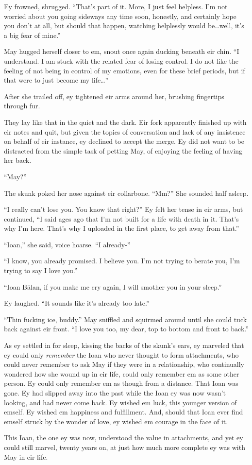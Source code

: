 Ey frowned, shrugged. ``That's part of it. More, I just feel helpless. I'm not worried about you going sideways any time soon, honestly, and certainly hope you don't at all, but should that happen, watching helplessly would be\ldots well, it's a big fear of mine.''

May hugged herself closer to em, snout once again ducking beneath eir chin. ``I understand. I am stuck with the related fear of losing control. I do not like the feeling of not being in control of my emotions, even for these brief periods, but if that were to just become my life\ldots{}''

After she trailed off, ey tightened eir arms around her, brushing fingertips through fur.

They lay like that in the quiet and the dark. Eir fork apparently finished up with eir notes and quit, but given the topics of conversation and lack of any insistence on behalf of eir instance, ey declined to accept the merge. Ey did not want to be distracted from the simple task of petting May, of enjoying the feeling of having her back.

``May?''

The skunk poked her nose against eir collarbone. ``Mm?'' She sounded half asleep.

``I really can't lose you. You know that right?'' Ey felt her tense in eir arms, but continued, ``I said ages ago that I'm not built for a life with death in it. That's why I'm here. That's why I uploaded in the first place, to get away from that.''

``Ioan,'' she said, voice hoarse. ``I already-''

``I know, you already promised. I believe you. I'm not trying to berate you, I'm trying to say I love you.''

``Ioan Bălan, if you make me cry again, I will smother you in your sleep.''

Ey laughed. ``It sounds like it's already too late.''

``Thin fucking ice, buddy.'' May sniffled and squirmed around until she could tuck back against eir front. ``I love you too, my dear, top to bottom and front to back.''

As ey settled in for sleep, kissing the backs of the skunk's ears, ey marveled that ey could only \emph{remember} the Ioan who never thought to form attachments, who could never remember to ask May if they were in a relationship, who continually wondered how she wound up in eir life, could only remember em as some other person. Ey could only remember em as though from a distance. That Ioan was gone. Ey had slipped away into the past while the Ioan ey was now wasn't looking, and had never come back. Ey wished em luck, this younger version of emself. Ey wished em happiness and fulfillment. And, should that Ioan ever find emself struck by the wonder of love, ey wished em courage in the face of it.

This Ioan, the one ey was now, understood the value in attachments, and yet ey could still marvel, twenty years on, at just how much more complete ey was with May in eir life.
